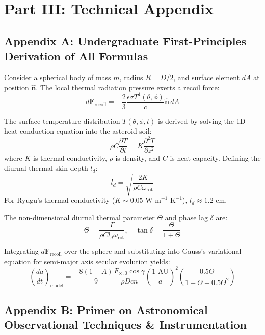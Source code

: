 \documentclass[11pt,a4paper]{article}
\begin{document}
\section*{Part III: Technical Appendix}

\subsection*{Appendix A: Undergraduate First-Principles Derivation of All Formulas}

Consider a spherical body of mass $m$, radius $R = D/2$, and surface element $dA$ at position $\hat{\mathbf{n}}$. The local thermal radiation pressure exerts a recoil force:
\begin{equation}
d\mathbf{F}_{\text{recoil}} = -\frac{2}{3} \frac{\epsilon \sigma T^4(\theta, \phi)}{c} \hat{\mathbf{n}} \, dA
\end{equation}

The surface temperature distribution $T(\theta, \phi, t)$ is derived by solving the 1D heat conduction equation into the asteroid soil:
\begin{equation}
\rho C \frac{\partial T}{\partial t} = K \frac{\partial^2 T}{\partial z^2}
\end{equation}
where $K$ is thermal conductivity, $\rho$ is density, and $C$ is heat capacity. Defining the diurnal thermal skin depth $l_d$:
\begin{equation}
l_d = \sqrt{\frac{2 K}{\rho C \omega_{\text{rot}}}}
\end{equation}
For Ryugu's thermal conductivity ($K \sim 0.05\text{ W m}^{-1}\text{ K}^{-1}$), $l_d \approx 1.2\text{ cm}$.

The non-dimensional diurnal thermal parameter $\Theta$ and phase lag $\delta$ are:
\begin{equation}
\Theta = \frac{\Gamma}{\rho C l_d \omega_{\text{rot}}}, \quad \tan \delta = \frac{\Theta}{1 + \Theta}
\end{equation}

Integrating $d\mathbf{F}_{\text{recoil}}$ over the sphere and substituting into Gauss's variational equation for semi-major axis secular evolution yields:
\begin{equation}
\left( \frac{da}{dt} \right)_{\text{model}} = -\frac{8 (1 - A)}{9} \frac{F_{\odot,0} \cos \gamma}{\rho D c n} \left( \frac{\text{1 AU}}{a} \right)^2 \left( \frac{0.5 \Theta}{1 + \Theta + 0.5 \Theta^2} \right)
\end{equation}

\subsection*{Appendix B: Primer on Astronomical Observational Techniques \& Instrumentation}
\end{document}

